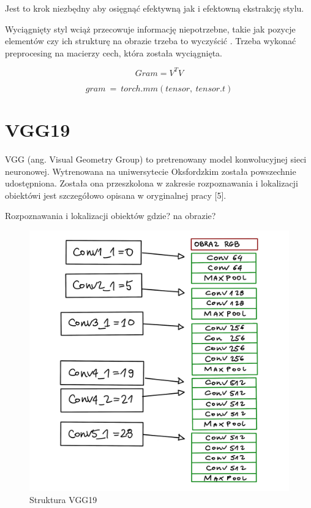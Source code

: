 \documentclass[brudnopis]{xmgr}
\begin{document}
Jest to krok niezbędny aby osięgnąć efektywną jak i efektowną ekstrakcję stylu.

Wyciągnięty styl wciąż przecowuje informację niepotrzebne, takie jak pozycje elementów czy ich strukturę na obrazie trzeba to wyczyścić .
Trzeba wykonać preprocesing na macierzy cech, która została wyciągnięta.

\begin{equation}
Gram = V^TV
\end{equation}


\begin{equation}
gram\:=\:torch.mm (tensor,\:tensor.t)
\end{equation}




\section{VGG19\label{s:dsssl}}

VGG (ang. Visual Geometry Group) to pretrenowany model konwolucyjnej sieci neuronowej. 
Wytrenowana na uniwersytecie Oksfordzkim została powszechnie udostępniona. Została ona  przeszkolona w zakresie rozpoznawania i lokalizacji obiektówi jest szczegółowo opisana w oryginalnej pracy [5].

Rozpoznawania i lokalizacji obiektów gdzie? na obrazie?

\begin{figure}[!tbh]
\centering
\includegraphics[width=.8\hsize]{fig/7}
\caption{Struktura VGG19\label{RYS.4}}
\end{figure}
\end{document}
